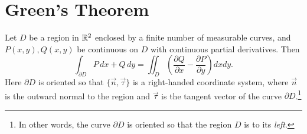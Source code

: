 \section{Green's Theorem}
\begin{theorem}
  Let $D$ be a region in $\mathbb{R}^2$ enclosed by a finite
  number of measurable curves, and $P(x, y), Q(x, y)$
  be continuous on $D$ with continuous partial
  derivatives. Then
  \[
    \int_{\partial D} P\, dx + Q\, dy = \iint_D \left(\frac{\partial Q}{\partial x} - \frac{\partial P}{\partial y}\right) dx dy. \tag{$*$}
  \]
  Here $\partial D$ is oriented so that $\{\vec{n}, \vec{\tau}\}$ is a right-handed coordinate
  system, where $\vec{n}$ is the outward normal to the
  region and $\vec{\tau}$ is the tangent vector of
  the curve $\partial D$.\footnote{In other words, the curve $\partial D$ is oriented so that the region $D$ is to its \emph{left}.}
\end{theorem}


